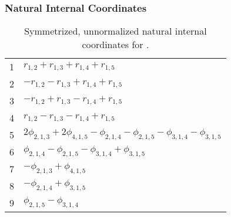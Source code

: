 \documentclass[10pt,oneside]{article}
\begin{document}
\clearpage

\subsubsection*{Natural Internal Coordinates}
\begin{table}[h!]
\centering
\caption{Symmetrized, unnormalized natural internal coordinates for .}
\small
\begin{tabular}{ll}
  1   & $r_{1,2} + r_{1,3} + r_{1,4} + r_{1,5}$ \\
  2   & $-r_{1,2} - r_{1,3} + r_{1,4} + r_{1,5}$ \\
  3   & $-r_{1,2} + r_{1,3} - r_{1,4} + r_{1,5}$ \\
  4   & $r_{1,2} - r_{1,3} - r_{1,4} + r_{1,5}$ \\
  5   & $2\phi_{2,1,3} + 2\phi_{4,1,5} - \phi_{2,1,4} - \phi_{2,1,5} - \phi_{3,1,4} - \phi_{3,1,5}$ \\
  6   & $\phi_{2,1,4} - \phi_{2,1,5} - \phi_{3,1,4} + \phi_{3,1,5}$ \\
  7   & $-\phi_{2,1,3} + \phi_{4,1,5}$ \\
  8   & $-\phi_{2,1,4} + \phi_{3,1,5}$ \\
  9   & $\phi_{2,1,5} - \phi_{3,1,4}$ \\
\end{tabular}
\end{table}

\clearpage

\subsection{\ \ \ }
\end{document}
